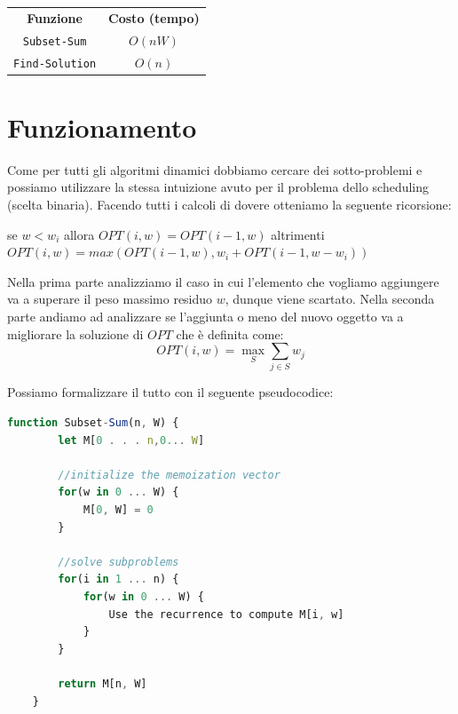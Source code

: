 \begin{center}
    \begin{tabular}{|c|c|}
        \centering
        \textbf{Funzione}    & \textbf{Costo (tempo)} \\
        \verb|Subset-Sum|    & $O(nW)$                \\
        \verb|Find-Solution| & $O(n)$                 \\
    \end{tabular}
\end{center}

\section{Funzionamento}

Come per tutti gli algoritmi dinamici dobbiamo cercare dei sotto-problemi e
possiamo utilizzare la stessa intuizione avuto per il problema dello scheduling
(scelta binaria). Facendo tutti i calcoli di dovere otteniamo la seguente
ricorsione:

\begin{center}
    se $w < w_i$ allora $OPT(i, w) = OPT(i-1,w)$ altrimenti\\
    $OPT(i, w) = max(OPT(i-1, w), w_i + OPT(i-1, w-w_i))$
\end{center}

Nella prima parte analizziamo il caso in cui l'elemento che vogliamo aggiungere va
a superare il peso massimo residuo $w$, dunque viene scartato. Nella seconda parte
andiamo ad analizzare se l'aggiunta o meno del nuovo oggetto va a migliorare
la soluzione di $OPT$ che è definita come:\\

\[
    OPT(i, w) = \max_{S} \sum_{j \in S} w_j
\]
\newpage

Possiamo formalizzare il tutto con il seguente pseudocodice:

\begin{lstlisting}[language=JavaScript]
    function Subset-Sum(n, W) {
        let M[0 . . . n,0... W]

        //initialize the memoization vector
        for(w in 0 ... W) {
            M[0, W] = 0
        }

        //solve subproblems
        for(i in 1 ... n) {
            for(w in 0 ... W) {
                Use the recurrence to compute M[i, w]
            }
        }

        return M[n, W]
    }
\end{lstlisting}


